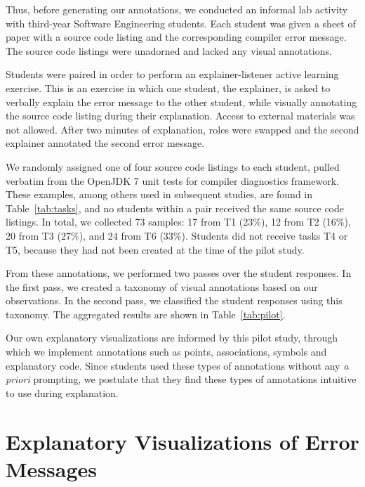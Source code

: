 \documentclass[conference]{IEEEtran}
\begin{document}
Thus, before generating our annotations, we conducted an informal lab activity with third-year Software Engineering students. Each student was given a sheet of paper with a source code listing and the corresponding compiler error message. The source code listings were unadorned and lacked any visual annotations.

Students were paired in order to perform an explainer-listener active learning exercise. This is an exercise in which one student, the explainer, is asked to verbally explain the error message to the other student, while visually annotating the source code listing during their explanation. Access to external materials was not allowed. After two minutes of explanation, roles were swapped and the second explainer annotated the second error message.

We randomly assigned one of four source code listings to each student, pulled verbatim from the OpenJDK 7 unit tests for compiler diagnostics framework. These examples, among others used in subsequent studies, are found in Table~\ref{tab:tasks}, and no students within a pair received the same source code listings. In total, we collected 73 samples:  17 from T1 (23\%), 12 from T2 (16\%), 20 from T3 (27\%), and 24 from T6 (33\%). Students did not receive tasks T4 or T5, because they had not been created at the time of the pilot study.

From these annotations, we performed two passes over the student responses. In the first pass, we created a taxonomy of visual annotations based on our observations. In the second pass, we classified the student responses using this taxonomy. The aggregated results are shown in Table~\ref{tab:pilot}.

Our own explanatory visualizations are informed by this pilot study, through which we implement annotations such as points, associations, symbols and explanatory code. Since students used these types of annotations without any \textit{a priori} prompting, we postulate that they find these types of annotations intuitive to use during explanation.


\section{Explanatory Visualizations of Error Messages}
\label{sec:motivation}
\end{document}
